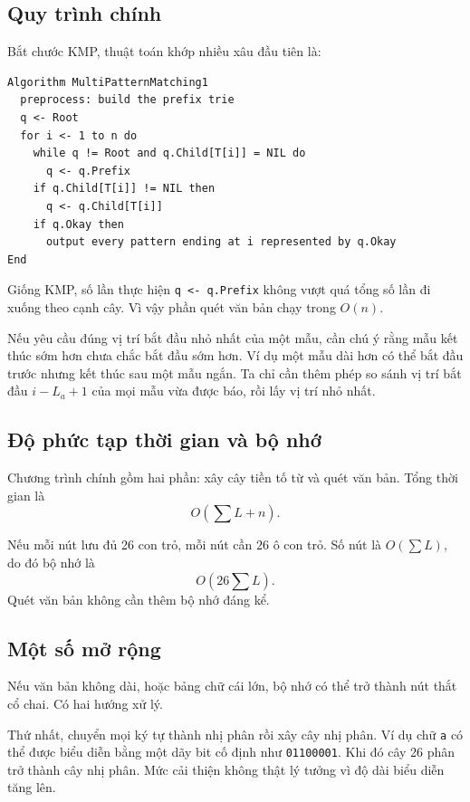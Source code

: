 \documentclass[11pt]{article}
\begin{document}
\subsection{Quy trình chính}

Bắt chước KMP, thuật toán khớp nhiều xâu đầu tiên là:

\begin{verbatim}
Algorithm MultiPatternMatching1
  preprocess: build the prefix trie
  q <- Root
  for i <- 1 to n do
    while q != Root and q.Child[T[i]] = NIL do
      q <- q.Prefix
    if q.Child[T[i]] != NIL then
      q <- q.Child[T[i]]
    if q.Okay then
      output every pattern ending at i represented by q.Okay
End
\end{verbatim}

Giống KMP, số lần thực hiện \texttt{q <- q.Prefix} không vượt quá tổng số lần
đi xuống theo cạnh cây. Vì vậy phần quét văn bản chạy trong $O(n)$.

Nếu yêu cầu đúng vị trí bắt đầu nhỏ nhất của một mẫu, cần chú ý rằng mẫu kết
thúc sớm hơn chưa chắc bắt đầu sớm hơn. Ví dụ một mẫu dài hơn có thể bắt đầu
trước nhưng kết thúc sau một mẫu ngắn. Ta chỉ cần thêm phép so sánh vị trí bắt
đầu $i-L_a+1$ của mọi mẫu vừa được báo, rồi lấy vị trí nhỏ nhất.

\subsection{Độ phức tạp thời gian và bộ nhớ}

Chương trình chính gồm hai phần: xây cây tiền tố từ và quét văn bản. Tổng thời
gian là
\[
  O\left(\sum L+n\right).
\]

Nếu mỗi nút lưu đủ 26 con trỏ, mỗi nút cần $26$ ô con trỏ. Số nút là
$O(\sum L)$, do đó bộ nhớ là
\[
  O\left(26\sum L\right).
\]
Quét văn bản không cần thêm bộ nhớ đáng kể.

\subsection{Một số mở rộng}

Nếu văn bản không dài, hoặc bảng chữ cái lớn, bộ nhớ có thể trở thành nút thắt
cổ chai. Có hai hướng xử lý.

Thứ nhất, chuyển mọi ký tự thành nhị phân rồi xây cây nhị phân. Ví dụ chữ
\texttt{a} có thể được biểu diễn bằng một dãy bit cố định như
\texttt{01100001}. Khi đó cây 26 phân trở thành cây nhị phân. Mức cải thiện
không thật lý tưởng vì độ dài biểu diễn tăng lên.
\end{document}
